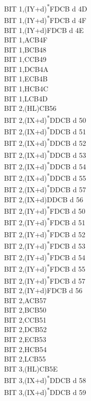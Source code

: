 \documentclass[twoside,openright,a4paper]{book}
\begin{document}
\begin{multicols}{3}
{\begin{tabbing}
	BIT 1,(IY+d)\textsuperscript{*}\>FDCB d 4D\\
	BIT 1,(IY+d)\textsuperscript{*}\>FDCB d 4F\\
	BIT 1,(IY+d)\>FDCB d 4E\\
	BIT 1,A\>CB4F\\
	BIT 1,B\>CB48\\
	BIT 1,C\>CB49\\
	BIT 1,D\>CB4A\\
	BIT 1,E\>CB4B\\
	BIT 1,H\>CB4C\\
	BIT 1,L\>CB4D\\
	BIT 2,(HL)\>CB56\\
	BIT 2,(IX+d)\textsuperscript{*}\>DDCB d 50\\
	BIT 2,(IX+d)\textsuperscript{*}\>DDCB d 51\\
	BIT 2,(IX+d)\textsuperscript{*}\>DDCB d 52\\
	BIT 2,(IX+d)\textsuperscript{*}\>DDCB d 53\\
	BIT 2,(IX+d)\textsuperscript{*}\>DDCB d 54\\
	BIT 2,(IX+d)\textsuperscript{*}\>DDCB d 55\\
	BIT 2,(IX+d)\textsuperscript{*}\>DDCB d 57\\
	BIT 2,(IX+d)\>DDCB d 56\\
	BIT 2,(IY+d)\textsuperscript{*}\>FDCB d 50\\
	BIT 2,(IY+d)\textsuperscript{*}\>FDCB d 51\\
	BIT 2,(IY+d)\textsuperscript{*}\>FDCB d 52\\
	BIT 2,(IY+d)\textsuperscript{*}\>FDCB d 53\\
	BIT 2,(IY+d)\textsuperscript{*}\>FDCB d 54\\
	BIT 2,(IY+d)\textsuperscript{*}\>FDCB d 55\\
	BIT 2,(IY+d)\textsuperscript{*}\>FDCB d 57\\
	BIT 2,(IY+d)\>FDCB d 56\\
	BIT 2,A\>CB57\\
	BIT 2,B\>CB50\\
	BIT 2,C\>CB51\\
	BIT 2,D\>CB52\\
	BIT 2,E\>CB53\\
	BIT 2,H\>CB54\\
	BIT 2,L\>CB55\\
	BIT 3,(HL)\>CB5E\\
	BIT 3,(IX+d)\textsuperscript{*}\>DDCB d 58\\
	BIT 3,(IX+d)\textsuperscript{*}\>DDCB d 59\\

\end{tabbing}}
\end{multicols}
\end{document}
